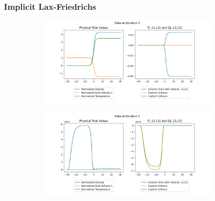 \documentclass{article}
\begin{document}
\subsubsection{Implicit Lax-Friedrichs}
\begin{figure}[H]
  \centering
  \begin{subfigure}[b]{\textwidth}
  \includegraphics[width=\textwidth]{imgs/lax_friedrichs/output_implicit/0.png}
  \end{subfigure}
  \hfill
  \begin{subfigure}[b]{\textwidth}
  \includegraphics[width=\textwidth]{imgs/lax_friedrichs/output_implicit/5.png}
  \end{subfigure}
\end{figure}
  
\end{document}
